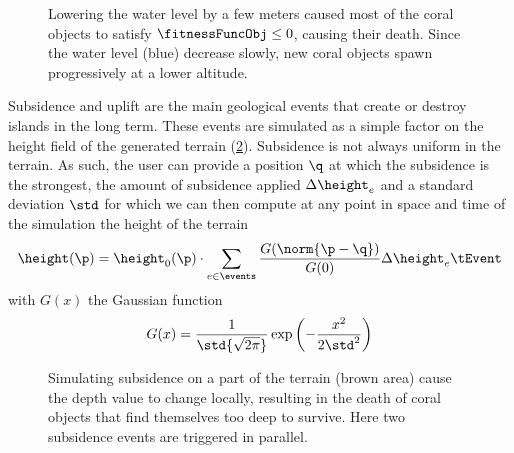 \begin{figure}
    \caption{Lowering the water level by a few meters caused most of the coral objects to satisfy $\fitnessFuncObj \leq 0$, causing their death. Since the water level (blue) decrease slowly, new coral objects spawn progressively at a lower altitude.}
    \label{fig:env-obj_water-event}
\end{figure}

Subsidence and uplift are the main geological events that create or destroy islands in the long term. These events are simulated as a simple factor on the height field of the generated terrain (\cref{fig:env-obj_subsidence-event}). Subsidence is not always uniform in the terrain. As such, the user can provide a position $\q$ at which the subsidence is the strongest, the amount of subsidence applied $\Delta \height_e$ and a standard deviation $\std$ for which we can then compute at any point in space and time of the simulation the height of the terrain
\begin{align*}
    \height(\p) = \height_0(\p) \cdot \sum_{e \in \events}{\frac{G(\norm{\p - \q})}{G(0)}} \Delta \height_e \tEvent 
\end{align*}
with $G(x)$ the Gaussian function
\begin{align*}
    G(x) = {\frac {1}{\std {\sqrt {2\pi }}}} \exp \left(-\frac {x^{2}}{2 \std ^{2}}\right)
\end{align*}

\begin{figure}
    \caption{Simulating subsidence on a part of the terrain (brown area) cause the depth value to change locally, resulting in the death of coral objects that find themselves too deep to survive. Here two subsidence events are triggered in parallel. }
    \label{fig:env-obj_subsidence-event}
\end{figure}

